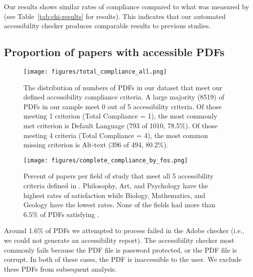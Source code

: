 Our results shows similar rates of compliance compared to what was measured by \citet{Lazar2017MakingTF} (see Table~\ref{tab:chi-results} for results). This indicates that our automated accessibility checker produces comparable results to previous studies.

\subsection{Proportion of papers with accessible PDFs}
\label{sec:sos_fos}

\begin{figure}[tb!]
  \centering
    \texttt{[image: figures/total\_compliance\_all.png]}
  \caption{The distribution of numbers of PDFs in our dataset that meet our defined accessibility compliance criteria. A large majority (8519) of PDFs in our sample meet 0 out of 5 accessibility criteria. Of those meeting 1 criterion (Total Compliance = 1), the most commonly met criterion is Default Language (793 of 1010, 78.5\%). Of those meeting 4 criteria (Total Compliance = 4), the most common missing criterion is Alt-text (396 of 494, 80.2\%).
  } 
  \label{fig:fos-total-compliance}
\end{figure}

\begin{figure}[t!]
  \centering
    \texttt{[image: figures/complete\_compliance\_by\_fos.png]}
  \caption{Percent of papers per field of study that meet all 5 accessibility criteria defined in . Philosophy, Art, and Psychology have the highest rates of  satisfaction while Biology, Mathematics, and Geology have the lowest rates. 
  None of the fields had more than $6.5\%$ of PDFs satisfying . 
  }
  \label{fig:fos-complete-compliance}
\end{figure}

Around 1.6\% of PDFs we attempted to process failed in the Adobe checker (i.e., we could not generate an accessibility report). The accessibility checker most commonly fails because the PDF file is password protected, or the PDF file is corrupt. In both of these cases, the PDF is inaccessible to the user. We exclude these PDFs from subsequent analysis.

